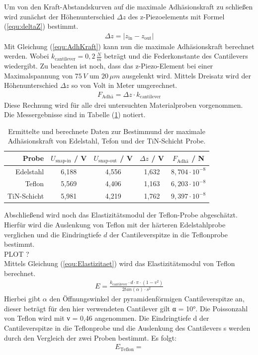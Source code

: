 Um von den Kraft-Abstandskurven auf die maximale Adh\"asionskraft zu schlie{\ss}en wird zun\"achst der Höhenunterschied $\Delta z$ des z-Piezoelements mit Formel (\ref{equ:deltaZ}) bestimmt.
\begin{align}
	\Delta z = \left\vert z_{\text{in}} - z_{\text{out}} \right\vert
\label{equ:deltaZ}
\end{align}
Mit Gleichung (\ref{equ:AdhKraft}) kann nun die maximale Adh\"asionskraft berechnet werden.
Wobei $k_{\text{cantilever}} = 0,2 \, \frac{N}{m}$ betr\"agt und die Federkonstante des Cantilevers wiedergibt.
Zu beachten ist noch, dass das z-Piezo-Element bei einer Maximalspannung von $75 \, V$ um $20 \, \mu m$ ausgelenkt wird.
Mittels Dreisatz wird der Höhenunterschied $\Delta z$ so von Volt in Meter umgerechnet.
\begin{align}
	F_{\text{Adh\"a}} = \Delta z \cdot k_{\text{cantilever}}
\label{equ:AdhKraft}
\end{align}
Diese Rechnung wird f\"ur alle drei untersuchten Materialproben vorgenommen.
Die Messergebnisse sind in Tabelle (\ref{tab:auf3}) notiert.
\begin{table}
	\centering
	\caption{Ermittelte und berechnete Daten zur Bestimmund der maximale Adhäsionskraft von Edelstahl, Tefon und der TiN-Schicht Probe.}
\begin{tabular}{|r|cccc|}
	\hline
	{Probe} & {$U_{\text{snap-in}}$} / V & {$U_{\text{snap-out}}$} / V & $\Delta z$ / V & {$F_{\text{Adh\"a}}$} / N \\
	\hline
	Edelstahl & 6,188 & 4,556 & 1,632 & $8,704 \cdot 10^{-8}$ \\
	Teflon	& 5,569 & 4,406 & 1,163 & $6,203 \cdot 10^{-8}$ \\
	TiN-Schicht & 5,981 & 4,219 & 1,762 & $9,397 \cdot 10^{-8}$ \\
	\hline
\end{tabular}
\label{tab:auf3}
\end{table}
Abschlie{\ss}end wird noch das Elastizitätsmodul der Teflon-Probe abgesch\"atzt.
Hierf\"ur wird die Auslenkung von Teflon mit der h\"arteren Edelstahlprobe verglichen und die Eindringtiefe $d$ der Cantileverspitze in die Teflonprobe bestimmt.
\\ PLOT ? \\
Mittels Gleichung (\ref{equ:Elastizitaet}) wird das Elastizitätsmodul von Teflon berechnet.
\begin{align}
	E = \frac{k_{\text{cantilever}} \cdot d \cdot \pi \cdot \left( 1 - v^2 \right)}{2 tan(\alpha) \cdot s^2}
\label{equ:Elastizitaet}
\end{align}
Hierbei gibt $\alpha$ den Öffnungswinkel der pyramidenförmigen Cantileverspitze an, dieser betr\"agt f\"ur den hier verwendeten Cantilever gilt α = 10°.
Die Poissonzahl von Teflon wird mit ν = 0,46 angenommen.
Die Eindringtiefe d der Cantileverspitze in die Teflonprobe und die Auslenkung des Cantilevers s werden durch den Vergleich der zwei Proben bestimmt.
Es folgt:
\begin{align*}
	E_{\text{Teflon}} = 
\end{align*}